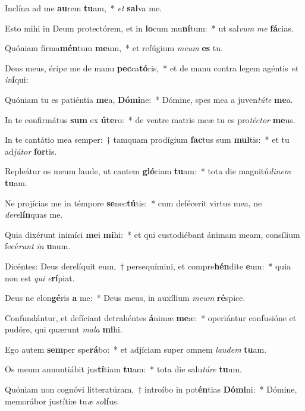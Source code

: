 \item Inclína ad me \textbf{au}rem \textbf{tu}am,~* \textit{et} \textbf{sal}va me.
\item Esto mihi in Deum protectórem, et in \textbf{lo}cum mu\textbf{ní}tum:~* ut sal\textit{vum} \textit{me} \textbf{fá}cias.
\item Quóniam firma\textbf{mén}tum \textbf{me}um,~* et refúgium \textit{me}\textit{um} \textbf{es} tu.
\item Deus meus, éripe me de manu \textbf{pec}ca\textbf{tó}ris,~* et de manu contra legem agéntis \textit{et} \textit{in}\textbf{í}qui:
\item Quóniam tu es patiéntia \textbf{me}a, \textbf{Dó}\textbf{mi}ne:~* Dómine, spes mea a juven\textit{tú}\textit{te} \textbf{me}a.
\item In te confirmátus \textbf{sum} ex \textbf{ú}\textbf{te}ro:~* de ventre matris meæ tu es pro\textit{téc}\textit{tor} \textbf{me}us.
\item In te cantátio mea semper:~† tamquam prodígium \textbf{fac}tus sum \textbf{mul}tis:~* et tu ad\textit{jú}\textit{tor} \textbf{for}tis.
\item Repleátur os meum laude, ut cantem \textbf{gló}riam \textbf{tu}am:~* tota die magnitú\textit{di}\textit{nem} \textbf{tu}am.
\item Ne projícias me in témpore \textbf{se}nec\textbf{tú}tis:~* cum defécerit virtus mea, ne \textit{de}\textit{re}\textbf{lín}quas me.
\item Quia dixérunt inimíci \textbf{me}i \textbf{mi}hi:~* et qui custodiébant ánimam meam, consílium fecé\textit{runt} \textit{in} \textbf{u}num.
\item Dicéntes: Deus derelíquit eum,~† persequímini, et compre\textbf{hén}dite \textbf{e}um:~* quia non est \textit{qui} \textit{e}\textbf{rí}piat.
\item Deus ne elon\textbf{gé}ris \textbf{a} me:~* Deus meus, in auxílium \textit{me}\textit{um} \textbf{ré}spice.
\item Confundántur, et defíciant detrahéntes \textbf{á}nimæ \textbf{me}æ:~* operiántur confusióne et pudóre, qui quærunt \textit{ma}\textit{la} \textbf{mi}hi.
\item Ego autem \textbf{sem}per spe\textbf{rá}bo:~* et adjíciam super omnem \textit{lau}\textit{dem} \textbf{tu}am.
\item Os meum annuntiábit jus\textbf{tí}tiam \textbf{tu}am:~* tota die salu\textit{tá}\textit{re} \textbf{tu}um.
\item Quóniam non cognóvi litteratúram,~† introíbo in pot\textbf{én}tias \textbf{Dó}\textbf{mi}ni:~* Dómine, memorábor justítiæ tu\textit{æ} \textit{so}\textbf{lí}us.
